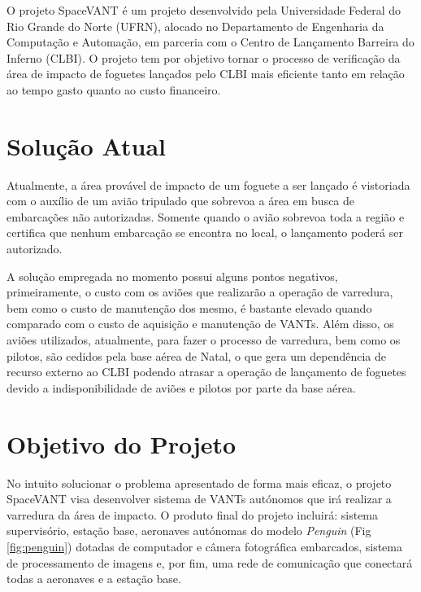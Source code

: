 \label{Cap:SpaceVANT}

O projeto SpaceVANT é um projeto desenvolvido pela Universidade Federal do Rio Grande do Norte (UFRN), alocado no Departamento de Engenharia da Computação e Automação, em parceria com o Centro de Lançamento Barreira do Inferno (CLBI). O projeto tem por objetivo tornar o processo de verificação da área de impacto de foguetes lançados pelo CLBI mais eficiente tanto em relação ao tempo gasto quanto ao custo financeiro.

\section{Solução Atual}

Atualmente, a área provável de impacto de um foguete a ser lançado é vistoriada com o auxílio de um avião tripulado que sobrevoa a área em busca de embarcações não autorizadas. Somente quando o avião sobrevoa toda a região e certifica que nenhum embarcação se encontra no local, o lançamento poderá ser autorizado.

A solução empregada no momento possui alguns pontos negativos, primeiramente, o custo com os aviões que realizarão a operação de varredura, bem como o custo de manutenção dos mesmo, é bastante elevado quando comparado com o custo de aquisição e manutenção de VANTs. Além disso, os aviões utilizados, atualmente, para fazer o processo de varredura, bem como os pilotos, são cedidos pela base aérea de Natal, o que gera um dependência de recurso externo ao CLBI podendo atrasar a operação de lançamento de foguetes devido a indisponibilidade de aviões e pilotos por parte da base aérea. 

\section{Objetivo do Projeto}


No intuito solucionar o problema apresentado de forma mais eficaz, o projeto SpaceVANT visa desenvolver sistema de VANTs autónomos que irá realizar a varredura da área de impacto. O produto final do projeto incluirá: sistema supervisório, estação base, aeronaves autónomas do modelo \emph{Penguin} (Fig \ref{fig:penguin}) dotadas de computador e câmera fotográfica embarcados, sistema de processamento de imagens e, por fim, uma rede de comunicação que conectará todas a aeronaves e a estação base. 

